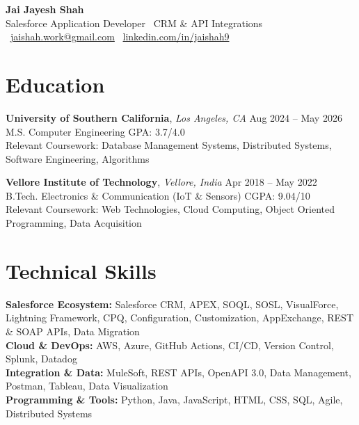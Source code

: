\documentclass[letterpaper,11pt]{article}
\begin{document}
\begin{center}
    {\LARGE \textbf{Jai Jayesh Shah}}\\
    {\normalsize Salesforce Application Developer \textbar\ CRM \& API Integrations}\\
    \small
    \faEnvelope\ \href{mailto:jaishah.work@gmail.com}{jaishah.work@gmail.com}
    \quad
    \faLinkedin\ \href{https://www.linkedin.com/in/jaishah9}{linkedin.com/in/jaishah9}
\end{center}
\vspace{-13pt}


\section*{Education}
\textbf{University of Southern California}, \textit{Los Angeles, CA} \hfill Aug 2024 -- May 2026 \\
M.S. Computer Engineering \hfill GPA: 3.7/4.0 \\
Relevant Coursework: Database Management Systems, Distributed Systems, Software Engineering, Algorithms

\textbf{Vellore Institute of Technology}, \textit{Vellore, India }\hfill Apr 2018 -- May 2022 \\
B.Tech. Electronics \& Communication (IoT \& Sensors) \hfill CGPA: 9.04/10 \\
Relevant Coursework: Web Technologies, Cloud Computing, Object Oriented Programming, Data Acquisition


\section*{Technical Skills}
\textbf{Salesforce Ecosystem:} Salesforce CRM, APEX, SOQL, SOSL, VisualForce, Lightning Framework, CPQ, Configuration, Customization, AppExchange, REST \& SOAP APIs, Data Migration \\
\textbf{Cloud \& DevOps:} AWS, Azure, GitHub Actions, CI/CD, Version Control, Splunk, Datadog \\
\textbf{Integration \& Data:} MuleSoft, REST APIs, OpenAPI 3.0, Data Management, Postman, Tableau, Data Visualization \\
\textbf{Programming \& Tools:} Python, Java, JavaScript, HTML, CSS, SQL, Agile, Distributed Systems


\end{document}
